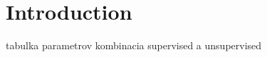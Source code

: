 \chapter*{Introduction}
\* %
\* %

{}
\* %

\* %
\* %
\* %


{}
\* %


{}
\* %
tabulka parametrov
\* kombinacia supervised a unsupervised

        
        
{}

{}

{}

{}


{}
\* %

\* %
